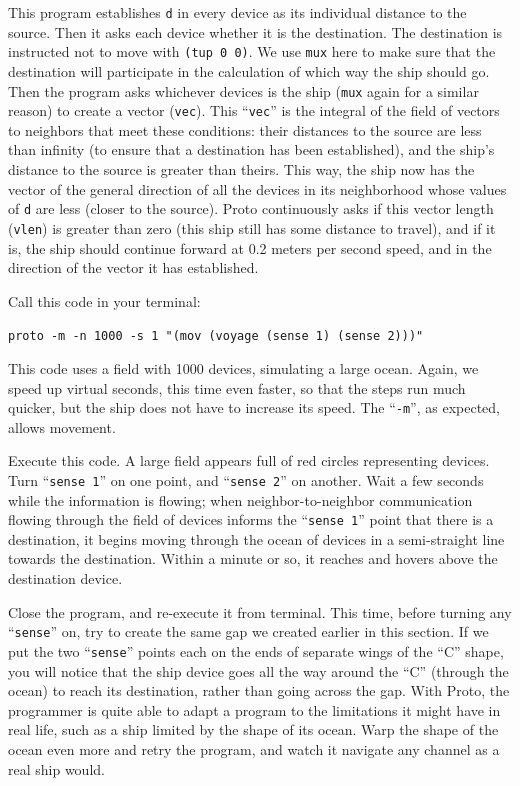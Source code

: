 \documentclass{article}
\newcommand\code[1]{\begin{center}\var{#1}\end{center}}
\newcommand\var[1]{{\tt #1}}
\newcommand\qvar[1]{``{\tt #1}''}
\begin{document}
This program establishes \var{d} in every device as its individual
distance to the source.  Then it asks each device whether it is the
destination.  The destination is instructed not to move with 
\var{(tup 0 0)}.  We use \var{mux} here to make sure that the
destination will participate in the calculation of which way the ship
should go.  Then the program asks whichever devices is the ship
(\var{mux} again for a similar reason) to create a vector (\var{vec}).
This \qvar{vec} is the integral of the field of vectors to neighbors
that meet these conditions: their distances to the source are less
than infinity (to ensure that a destination has been established), and
the ship's distance to the source is greater than theirs.  This way,
the ship now has the vector of the general direction of all the
devices in its neighborhood whose values of \var{d} are less (closer
to the source).  Proto continuously asks if this vector length
(\var{vlen}) is greater than zero (this ship still has some distance
to travel), and if it is, the ship should continue forward at 0.2
meters per second speed, and in the direction of the vector it has
established.

Call this code in your terminal:

\code{proto -m -n 1000 -s 1 "(mov (voyage (sense 1) (sense 2)))"}

This code uses a field with 1000 devices, simulating a large
ocean.  Again, we speed up virtual seconds, this time even faster, so
that the steps run much quicker, but the ship does not have to
increase its speed.  The \qvar{-m}, as expected, allows movement.

Execute this code.  A large field appears full of red circles
representing devices.  Turn \qvar{sense 1} on one point, and
\qvar{sense 2} on another.  Wait a few seconds while the information
is flowing; when neighbor-to-neighbor communication flowing through
the field of devices informs the \qvar{sense 1} point that there is a
destination, it begins moving through the ocean of devices in a
semi-straight line towards the destination.  Within a minute or so, it
reaches and hovers above the destination device.

Close the program, and re-execute it from terminal.  This time, before
turning any \qvar{sense} on, try to create the same gap we created
earlier in this section.  If we put the two \qvar{sense} points each
on the ends of separate wings of the ``C'' shape, you will notice that
the ship device goes all the way around the ``C'' (through the ocean)
to reach its destination, rather than going across the gap.  With
Proto, the programmer is quite able to adapt a program to the
limitations it might have in real life, such as a ship limited by the
shape of its ocean.  Warp the shape of the ocean even more and retry
the program, and watch it navigate any channel as a real ship would.
\end{document}

